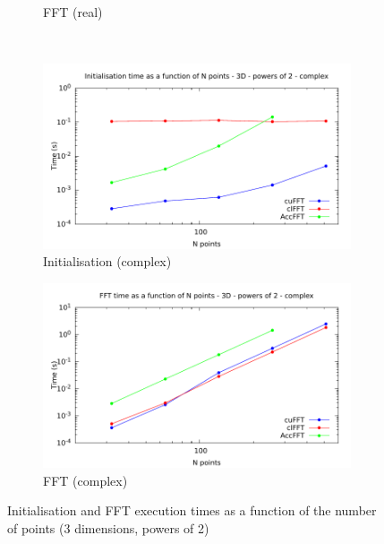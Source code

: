\documentclass[12pt, a4paper]{article}
\begin{document}
\begin{figure}[htb]
\begin{subfigure}{.5\textwidth}
\caption{FFT (real)}
\label{FFTPOW23DRE}
\end{subfigure}\\
\begin{subfigure}{.5\textwidth}
\centering
\includegraphics[width=.9\linewidth]{graphs/fft-3d-pow2-c-init.pdf}
\caption{Initialisation (complex)}
\label{FFTPOW23DCI}
\end{subfigure}%
\begin{subfigure}{.5\textwidth}
\centering
\includegraphics[width=.9\linewidth]{graphs/fft-3d-pow2-c-exec.pdf}
\caption{FFT (complex)}
\label{FFTPOW23DCE}
\end{subfigure}
\caption{Initialisation and FFT execution times as a function of the number of points (3 dimensions, powers of 2)}
\label{FFTPOW23D}
\end{figure}
\end{document}
